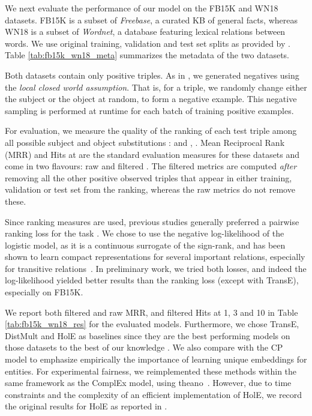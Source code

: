 \documentclass{article}
\begin{document}
We next evaluate the performance of our model on the FB15K and WN18 datasets. FB15K is a subset of \emph{Freebase}, a curated KB of general facts, whereas WN18 is a subset of \emph{Wordnet}, a database featuring lexical relations between words.  We use original training, validation and test set splits as provided by \citet{bordes2013translating}. Table \ref{tab:fb15k_wn18_meta} summarizes the metadata of the two datasets.



Both datasets contain only positive triples. As in \citet{bordes2013translating}, we generated negatives using the \emph{local closed world assumption}. That is, for a triple, we randomly change either the subject or the object at random, to form a negative example. 
This negative sampling is performed at runtime for each batch of training positive examples. 


For evaluation, we measure the quality of the ranking of each test triple among all possible subject and object substitutions
:  and , .
 Mean Reciprocal Rank (MRR) and Hits at  are the standard evaluation measures for these datasets and come in two flavours: raw and filtered \cite{bordes2013translating}. The filtered metrics are computed \emph{after} removing all the other positive observed triples that appear in either training, validation or test set from the ranking, whereas the raw metrics do not remove these. 


Since ranking measures are used, previous studies generally preferred a pairwise ranking loss for the task \cite{bordes2013translating,nickel_2016_holographic}. We chose to use the negative log-likelihood of the logistic model, as it is a continuous surrogate of the sign-rank, and has been shown to learn compact representations for several important relations, especially for transitive relations~\cite{bouchard2015}. In preliminary work, we tried both losses, and indeed the log-likelihood yielded better results than the ranking loss (except with TransE), especially on FB15K.


We report both filtered and raw MRR, and filtered Hits at 1, 3 and 10 in Table \ref{tab:fb15k_wn18_res} for the evaluated models. Furthermore, we chose TransE, DistMult and HolE as baselines since they are the best performing models on those datasets to the best of our knowledge \cite{nickel_2016_holographic,Yang2015}. We also compare with the CP model to emphasize empirically the importance of learning unique embeddings for entities. 
For experimental fairness, we reimplemented these methods within the same framework as the ComplEx model, using theano~\cite{theano}. 
However, due to time constraints and the complexity of an efficient implementation of HolE, we record the original results for HolE as reported in \citet{nickel_2016_holographic}.
\end{document}
